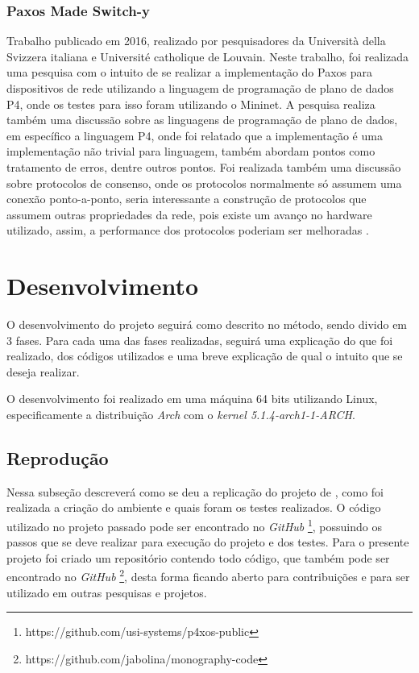 \documentclass[
    12pt,
    openright, 
    oneside,
    a4paper,
    french,
    english,
    brazil
    ]{facom-ufu-abntex2}
\theoremstyle{definition}
\begin{document}
\subsection{Paxos Made Switch-y}
Trabalho publicado em 2016, realizado por pesquisadores da Università della Svizzera italiana
e Université catholique de Louvain. Neste trabalho, foi realizada uma pesquisa com o intuito
de se realizar a implementação do Paxos para dispositivos de rede utilizando a linguagem
de programação de plano de dados P4, onde os testes para isso foram utilizando o Mininet. 
A pesquisa realiza também uma discussão sobre as linguagens de programação de plano de dados,
em específico a linguagem P4, onde foi relatado que a implementação é uma
implementação não trivial para linguagem, também abordam pontos como tratamento de erros,
dentre outros pontos. Foi realizada também uma discussão sobre protocolos de consenso,
onde os protocolos normalmente só assumem uma conexão ponto-a-ponto, seria interessante a
construção de protocolos que assumem outras propriedades da rede, pois existe um avanço
no hardware utilizado, assim, a performance dos protocolos poderiam ser melhoradas 
\cite{dang2016paxos}.

\chapter{Desenvolvimento}
O desenvolvimento do projeto seguirá como descrito no método, sendo divido em 
3 fases. Para cada uma das fases realizadas, seguirá uma explicação do que foi realizado,
dos códigos utilizados e uma breve explicação de qual o intuito que se deseja realizar.

O desenvolvimento foi realizado em uma máquina 64 bits utilizando Linux, especificamente a 
distribuição \emph{Arch} com o \emph{kernel 5.1.4-arch1-1-ARCH}.

\section{Reprodução}
Nessa subseção descreverá como se deu a replicação do projeto de \cite{dang2016paxos}, como foi realizada 
a criação do ambiente e quais foram os testes
realizados. O código utilizado no projeto passado pode ser encontrado no \emph{GitHub}
\footnote{https://github.com/usi-systems/p4xos-public}, possuindo os passos que
se deve realizar para execução do projeto e dos testes. Para o presente projeto foi 
criado um repositório contendo todo código, que também pode ser encontrado no \emph{GitHub}
\footnote{https://github.com/jabolina/monography-code}, desta forma ficando aberto
para contribuições e para ser utilizado em outras pesquisas e projetos.
\end{document}
